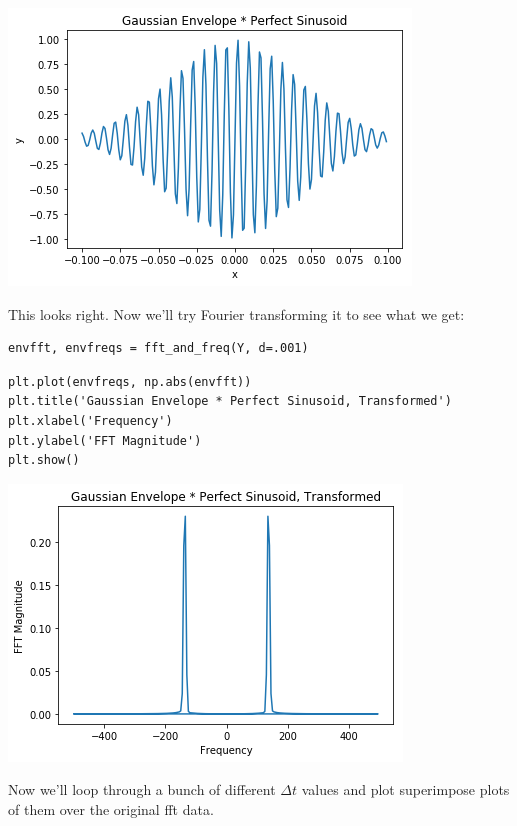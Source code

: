 \documentclass[11pt]{article}
\begin{document}
\includegraphics[width=.9\linewidth]{./obipy-resources/170877CF.png}

This looks right. Now we'll try Fourier transforming it to see what we get:

\begin{verbatim}
envfft, envfreqs = fft_and_freq(Y, d=.001)
\end{verbatim}


\begin{verbatim}
plt.plot(envfreqs, np.abs(envfft))
plt.title('Gaussian Envelope * Perfect Sinusoid, Transformed')
plt.xlabel('Frequency')
plt.ylabel('FFT Magnitude')
plt.show()
\end{verbatim}

\includegraphics[width=.9\linewidth]{./obipy-resources/17087VXR.png}

Now we'll loop through a bunch of different $\Delta t$ values and plot
superimpose plots of them over the original fft data.
\end{document}
